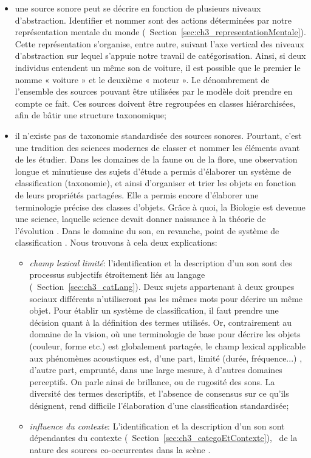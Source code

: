 \begin{itemize}
\item une source sonore peut se décrire en fonction de plusieurs niveaux d'abstraction. Identifier et nommer sont des actions déterminées par notre représentation mentale du monde (\cf~Section~\ref{sec:ch3_representationMentale}). Cette représentation s'organise, entre autre, suivant l'axe vertical des niveaux d'abstraction sur lequel s'appuie notre travail de catégorisation. Ainsi, si deux individus entendent un même son de voiture, il est possible que le premier le nomme « voiture » et le deuxième « moteur ». Le dénombrement de l'ensemble des sources pouvant être utilisées par le modèle doit prendre en compte ce fait. Ces sources doivent être regroupées en classes hiérarchisées, afin de bâtir une structure taxonomique;
\item il n'existe pas de taxonomie standardisée des sources sonores. Pourtant, c'est une tradition des sciences modernes de classer et nommer les éléments avant de les étudier. Dans les domaines de la faune ou de la flore, une observation longue et minutieuse des sujets d'étude a permis d'élaborer un système de classification (taxonomie), et ainsi d'organiser et trier les objets en fonction de leurs propriétés partagées. Elle a permis encore d'élaborer une terminologie précise des classes d'objets. Grâce à quoi, la Biologie est devenue une science, laquelle science devait donner naissance à la théorie de l'évolution \citep{lecointre2006tree}. Dans le domaine du son, en revanche, point de système de classification \citep{dubois2000categories,niessen2010categories}. Nous trouvons à cela deux explications:

\begin{itemize}
\item \emph{champ lexical limité}: l'identification et la description d'un son sont des processus subjectifs étroitement liés au langage (\cf~Section~\ref{sec:ch3_catLang}). Deux sujets appartenant à deux groupes sociaux différents n'utiliseront pas les mêmes mots pour décrire un même objet. Pour établir un système de classification, il faut prendre une décision quant à la définition des termes utilisés. Or, contrairement au domaine de la vision, où une terminologie de base pour décrire les objets (couleur, forme etc.) est globalement partagée, le champ lexical applicable aux phénomènes acoustiques est, d'une part, limité (durée, fréquence...) \citep{dubois2000categories}, d'autre part, emprunté, dans une large mesure, à d'autres domaines perceptifs. On parle ainsi de brillance, ou de rugosité des sons. La diversité des termes descriptifs, et l'absence de consensus sur ce qu'ils désignent, rend difficile l'élaboration d'une classification standardisée;
\item \emph{influence du contexte}: L'identification et la description d'un son sont dépendantes du contexte (\cf~Section~\ref{sec:ch3_categoEtContexte}), \ie~de la nature des sources co-occurrentes dans la scène \citep{ballas1987interpreting,niessen2008disambiguating,gygi2011incongruency}.
\end{itemize}
\end{itemize}

